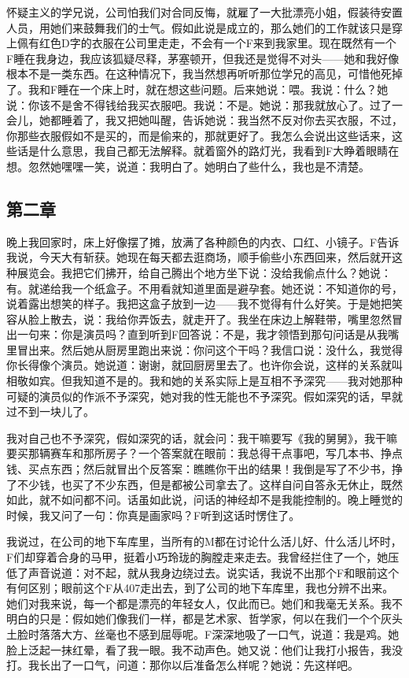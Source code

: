 怀疑主义的学兄说，公司怕我们对合同反悔，就雇了一大批漂亮小姐，假装待安置人员，用她们来鼓舞我们的士气。假如此说是成立的，那么她们的工作就该只是穿上佩有红色D字的衣服在公司里走走，不会有一个F来到我家里。现在既然有一个F睡在我身边，我应该狐疑尽释，茅塞顿开，但我还是觉得不对头——她和我好像根本不是一类东西。在这种情况下，我当然想再听听那位学兄的高见，可惜他死掉了。我和F睡在一个床上时，就在想这些问题。后来她说：喂。我说：什么？她说：你该不是舍不得钱给我买衣服吧。我说：不是。她说：那我就放心了。过了一会儿，她都睡着了，我又把她叫醒，告诉她说：我当然不反对你去买衣服，不过，你那些衣服假如不是买的，而是偷来的，那就更好了。我怎么会说出这些话来，这些话是什么意思，我自己都无法解释。就着窗外的路灯光，我看到F大睁着眼睛在想。忽然她嘿嘿一笑，说道：我明白了。她明白了些什么，我也是不清楚。

\subsection{第二章}

晚上我回家时，床上好像摆了摊，放满了各种颜色的内衣、口红、小镜子。F告诉我说，今天大有斩获。她现在每天都去逛商场，顺手偷些小东西回来，然后就开这种展览会。我把它们拂开，给自己腾出个地方坐下说：没给我偷点什么？她说：有。就递给我一个纸盒子。不用看就知道里面是避孕套。她还说：不知道你的号，说着露出想笑的样子。我把这盒子放到一边——我不觉得有什么好笑。于是她把笑容从脸上散去，说：我给你弄饭去，就走开了。我坐在床边上解鞋带，嘴里忽然冒出一句来：你是演员吗？直到听到F回答说：不是，我才领悟到那句问话是从我嘴里冒出来。然后她从厨房里跑出来说：你问这个干吗？我信口说：没什么，我觉得你长得像个演员。她说道：谢谢，就回厨房里去了。也许你会说，这样的关系就叫相敬如宾。但我知道不是的。我和她的关系实际上是互相不予深究——我对她那种可疑的演员似的作派不予深究，她对我的性无能也不予深究。假如深究的话，早就过不到一块儿了。 

我对自己也不予深究，假如深究的话，就会问：我干嘛要写《我的舅舅》，我干嘛要买那辆赛车和那所房子？一个答案就在眼前：我总得干点事吧，写几本书、挣点钱、买点东西；然后就冒出个反答案：瞧瞧你干出的结果！我倒是写了不少书，挣了不少钱，也买了不少东西，但是都被公司拿去了。这样自问自答永无休止，既然如此，就不如问都不问。话虽如此说，问话的神经却不是我能控制的。晚上睡觉的时候，我又问了一句：你真是画家吗？F听到这话时愣住了。 

我说过，在公司的地下车库里，当所有的M都在讨论什么活儿好、什么活儿坏时，F们却穿着合身的马甲，挺着小巧玲珑的胸膛走来走去。我曾经拦住了一个，她压低了声音说道：对不起，就从我身边绕过去。说实话，我说不出那个F和眼前这个有何区别；眼前这个F从407走出去，到了公司的地下车库里，我也分辨不出来。她们对我来说，每一个都是漂亮的年轻女人，仅此而已。她们和我毫无关系。我不明白的只是：假如她们像我们一样，都是艺术家、哲学家，何以在我们一个个灰头土脸时落落大方、丝毫也不感到屈辱呢。F深深地吸了一口气，说道：我是鸡。她脸上泛起一抹红晕，看了我一眼。我不动声色。她又说：他们让我打小报告，我没打。我长出了一口气，问道：那你以后准备怎么样呢？她说：先这样吧。 

